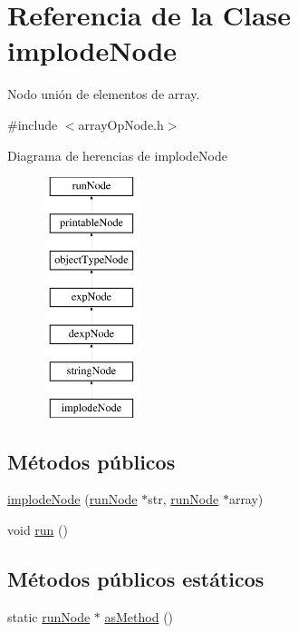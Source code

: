 \hypertarget{classimplodeNode}{\section{Referencia de la Clase implode\-Node}
\label{classimplodeNode}
}


Nodo unión de elementos de array.  




{\ttfamily \#include $<$array\-Op\-Node.\-h$>$}

Diagrama de herencias de implode\-Node\begin{figure}[H]
\begin{center}
\leavevmode
\includegraphics[height=7.000000cm]{classimplodeNode}
\end{center}
\end{figure}
\subsection*{Métodos públicos}
\begin{DoxyCompactItemize}
\item 
\hyperlink{classimplodeNode_a164e30b3b9c2e6246877cc3dba14bdc8}{implode\-Node} (\hyperlink{classrunNode}{run\-Node} $\ast$str, \hyperlink{classrunNode}{run\-Node} $\ast$array)
\item 
void \hyperlink{classimplodeNode_af08c8e5a3ba8cdd2c1aff5645fe72ad4}{run} ()
\end{DoxyCompactItemize}
\subsection*{Métodos públicos estáticos}
\begin{DoxyCompactItemize}
\item 
static \hyperlink{classrunNode}{run\-Node} $\ast$ \hyperlink{classimplodeNode_afee568f6952d1cb69d800d41a86a923a}{as\-Method} ()
\end{DoxyCompactItemize}
